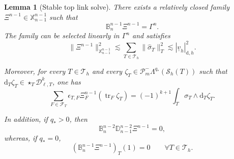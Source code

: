 \documentclass[a4paper,11pt]{article}
\newtheorem{lemma}[theorem]{Lemma}
\theoremstyle{definition}
\newcommand{\DIFF}{\mathrm{d}}
\newcommand{\Sh}{\mathcal{S}_h}
\newcommand{\PLtrim}[2]{\mathcal{P}_{#1}^{-}\Lambda^{#2}}
\newcommand{\Dpoly}[2]{\mathcal D_{\ell,#1}^{#2}}
\newcommand{\trc}{\operatorname{tr}}
\newcommand{\epsTF}{\epsilon_{T,F}}
\begin{document}
\begin{lemma}[Stable top link solve]
\label{lem:top.link.solve}
There exists a relatively closed family $\Xi^{n-1}\in\mathbb X_{n-1}^{n-1}$ such that
\begin{equation}\label{eq:top.full.system}
  \mathbb B_n^{n-1}\Xi^{n-1}
  =
  \Gamma^n.
\end{equation}
The family can be selected linearly in $\Gamma^n$ and satisfies
\begin{equation}\label{eq:top.link.stability}
  \|\Xi^{n-1}\|_{\mathbb X_{n-1}^{n-1}}^2
  \lesssim
  \sum_{T\in\mathcal T_h}
  \|\widehat\sigma_T\|_T^2
  \lesssim
  |\underline v_h|_{\DIFF,h}^2.
\end{equation}

Moreover, for every $T\in\mathcal T_h$ and every $\zeta_T\in\PLtrim{m}{q_*}(\Sh(T))$ such that $\DIFF_T\zeta_T\in\star_T\Dpoly{T}{k}$, one has
\begin{equation}\label{eq:top.reconstruction.restriction}
  \sum_{F\in\mathcal F_T}
  \epsTF
  \Xi_F^{n-1}(\trc_F\zeta_T)
  =
  (-1)^{k+1}
  \int_T
  \sigma_T\wedge\DIFF_T\zeta_T.
\end{equation}

In addition, if $q_*>0$, then
\begin{equation}\label{eq:top.vertical.compatibility}
  \mathbb B_n^{n-2}
  \mathbb D_{n-1}^{n-2}\Xi^{n-1}
  =
  0,
\end{equation}
whereas, if $q_*=0$,
\begin{equation}\label{eq:top.augmentation}
  \left(
    \mathbb B_n^{n-1}\Xi^{n-1}
  \right)_T(1)
  =
  0
  \qquad
  \forall T\in\mathcal T_h.
\end{equation}
\end{lemma}
\end{document}
